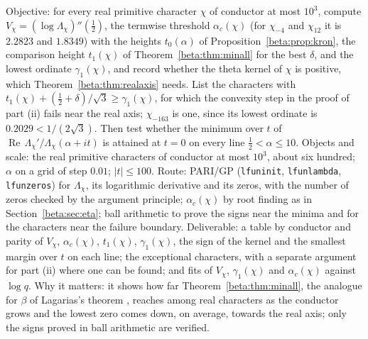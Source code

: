 \begin{compproblem}\label{cp:betareal}
Objective: for every real primitive character $\chi$ of conductor at most $10^3$, compute $V_\chi=(\log\Lambda_\chi)''(\tfrac12)$, the termwise threshold $\alpha_c(\chi)$ (for $\chi_{-4}$ and $\chi_{12}$ it is $2.2823$ and $1.8349$) with the heights $t_0(\alpha)$ of Proposition~\ref{beta:prop:kron}, the comparison height $t_1(\chi)$ of Theorem~\ref{beta:thm:minall} for the best $\delta$, and the lowest ordinate $\gamma_1(\chi)$, and record whether the theta kernel of $\chi$ is positive, which Theorem~\ref{beta:thm:realaxis} needs. List the characters with $t_1(\chi)+(\tfrac12+\delta)/\sqrt3\ge\gamma_1(\chi)$, for which the convexity step in the proof of part (ii) fails near the real axis; $\chi_{-163}$ is one, since its lowest ordinate is $0.2029<1/(2\sqrt3)$. Then test whether the minimum over $t$ of $\operatorname{Re}\,\Lambda_\chi'/\Lambda_\chi(\alpha+it)$ is attained at $t=0$ on every line $\tfrac12<\alpha\le10$. Objects and scale: the real primitive characters of conductor at most $10^3$, about six hundred; $\alpha$ on a grid of step $0.01$; $|t|\le100$. Route: PARI/GP (\texttt{lfuninit}, \texttt{lfunlambda}, \texttt{lfunzeros}) for $\Lambda_\chi$, its logarithmic derivative and its zeros, with the number of zeros checked by the argument principle; $\alpha_c(\chi)$ by root finding as in Section~\ref{beta:sec:eta}; ball arithmetic to prove the signs near the minima and for the characters near the failure boundary. Deliverable: a table by conductor and parity of $V_\chi$, $\alpha_c(\chi)$, $t_1(\chi)$, $\gamma_1(\chi)$, the sign of the kernel and the smallest margin over $t$ on each line; the exceptional characters, with a separate argument for part (ii) where one can be found; and fits of $V_\chi$, $\gamma_1(\chi)$ and $\alpha_c(\chi)$ against $\log q$. Why it matters: it shows how far Theorem~\ref{beta:thm:minall}, the analogue for $\beta$ of Lagarias's theorem \cite{lagarias1999}, reaches among real characters as the conductor grows and the lowest zero comes down, on average, towards the real axis; only the signs proved in ball arithmetic are verified.
\end{compproblem}

